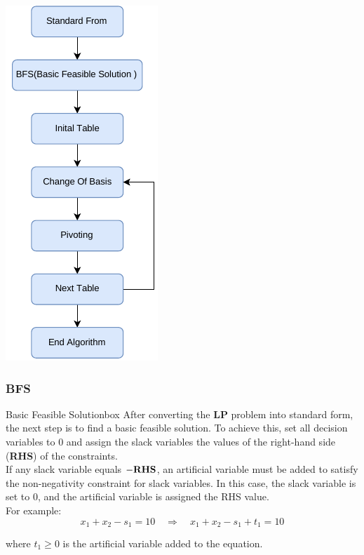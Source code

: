 \vspace{0.35cm}
\begin{center}
    \includegraphics[height=0.9\textheight]{Chapters/Diagram/simplexe.drawio.pdf}
\end{center}


\subsubsection{BFS}

\begin{prettyBox}{Basic Feasible Solution}{box}
After converting the \textbf{LP} problem into standard form, the next step is to find a basic feasible solution. 
To achieve this, set all decision variables to 0 and assign the slack variables the values of the right-hand side (\textbf{RHS}) of the constraints.\\[0.15cm]
If any slack variable equals \(-\text{\textbf{RHS}}\), an artificial variable must be added to satisfy the non-negativity constraint for slack variables. 
In this case, the slack variable is set to 0, and the artificial variable is assigned the RHS value.\\[0.2cm]
For example: 
\[
x_1 + x_2 - s_1 = 10 \quad \Longrightarrow \quad x_1 + x_2 - s_1 + t_1 = 10
\]

where \(t_1 \geq 0\) is the artificial variable added to the equation.
\end{prettyBox}

